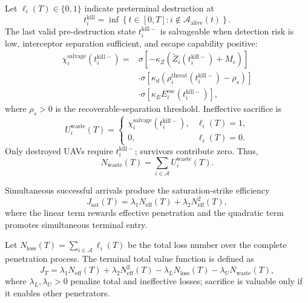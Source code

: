 \documentclass{cja}
\begin{document}
Let $\ell_i(T)\in\{0,1\}$ indicate preterminal destruction at
\begin{equation}
t_i^{\mathrm{kill}}
=
\inf\left\{
t\in[0,T]:
i\notin\mathcal A_{\mathrm{alive}}(t)
\right\}.
\end{equation}
The last valid pre-destruction state $t_i^{\mathrm{kill}-}$ is salvageable when detection risk is low, interceptor separation sufficient, and escape capability positive:
\begin{equation}
\begin{aligned}
\chi_i^{\mathrm{salvage}}\!\left(t_i^{\mathrm{kill}-}\right)
={}&
\sigma\!\left[-\kappa_Z\left(\widetilde Z_i\!\left(t_i^{\mathrm{kill}-}\right)+M_c\right)\right]\\
&\cdot
\sigma\!\left[\kappa_d\left(\rho_i^{\mathrm{threat}}\!\left(t_i^{\mathrm{kill}-}\right)-\rho_s\right)\right]\\
&\cdot
\sigma\!\left[\kappa_E E_i^{\mathrm{esc}}\!\left(t_i^{\mathrm{kill}-}\right)\right],
\end{aligned}
\end{equation}
where $\rho_s>0$ is the recoverable-separation threshold. Ineffective sacrifice is
\begin{equation}
U_i^{\mathrm{waste}}(T)
=
\begin{cases}
\chi_i^{\mathrm{salvage}}\!\left(t_i^{\mathrm{kill}-}\right),
&
\ell_i(T)=1,\\[2mm]
0,
&
\ell_i(T)=0.
\end{cases}
\end{equation}
Only destroyed UAVs require $t_i^{\mathrm{kill}-}$; survivors contribute zero. Thus,
\begin{equation}
N_{\mathrm{waste}}(T)
=
\sum_{i\in\mathcal{A}} U_i^{\mathrm{waste}}(T).
\end{equation}

Simultaneous successful arrivals produce the saturation-strike efficiency
\begin{equation}
J_{\mathrm{sat}}(T)
=
\lambda_1 N_{\mathrm{eff}}(T)
+
\lambda_2 N_{\mathrm{eff}}^2(T),
\end{equation}
where the linear term rewards effective penetration and the quadratic term promotes simultaneous terminal entry.

Let $N_{\mathrm{loss}}(T)=\sum_{i\in\mathcal{A}}\ell_i(T)$ be the total loss number over the complete penetration process. The terminal total value function is defined as
\begin{equation}
J_T
=
\lambda_1 N_{\mathrm{eff}}(T)
+
\lambda_2 N_{\mathrm{eff}}^2(T)
-
\lambda_L N_{\mathrm{loss}}(T)
-
\lambda_U N_{\mathrm{waste}}(T),
\end{equation}
where $\lambda_L,\lambda_U>0$ penalize total and ineffective losses; sacrifice is valuable only if it enables other penetrators.
\end{document}
